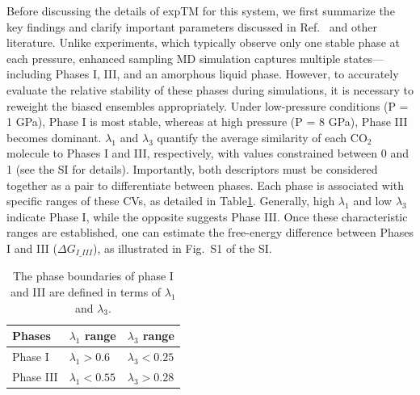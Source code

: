 \documentclass[aip,jcp,reprint,longbibliography]{revtex4-1}
\newcommand{\ryw}[1]{{\color{blue}{#1}}}
\begin{document}
Before discussing the details of expTM for this system, we first summarize the key findings and clarify important parameters discussed in Ref.~ and other literature.
Unlike experiments, which typically observe only one stable phase at each pressure, enhanced sampling MD simulation captures multiple states—including Phases I, III, and an amorphous liquid phase. However, to accurately evaluate the relative stability of these phases during simulations, it is necessary to reweight the biased ensembles appropriately.\cite{Ilaria2017CO2} Under low-pressure conditions (P = 1 GPa), Phase I is most stable, whereas at high pressure (P = 8 GPa), Phase III becomes dominant. 
\ryw{Instead of using the full atomic coordinates, we employ the CVs $\lambda_1$ and $\lambda_3$ to characterize the phase states, effectively reducing the description to a two-dimensional space.  }
$\lambda_1$ and $\lambda_3$ quantify the average similarity of each CO$_2$ molecule to Phases I and III, respectively, with values constrained between 0 and 1 (see the SI for details). 
Importantly, both descriptors must be considered together as a pair to differentiate between phases. Each phase is associated with specific ranges of these CVs, as detailed in Table\ref{tab:phaseboundary}. Generally, high $\lambda_1$ and low $\lambda_3$ indicate Phase I, while the opposite suggests Phase III. Once these characteristic ranges are established, one can estimate the free-energy difference between Phases I and III ($\Delta G_{I\_III}$), as illustrated in Fig.~S1 of the SI.


\begin{table}[ht!]
\begin{tabularx}{0.5\textwidth}{XXX}
\hline
    Phases & $\lambda_1$ range  & $\lambda_3$  range \\
\hline
Phase I &  $\lambda_1>0.6$  &  $\lambda_3<0.25$ \\
Phase III & $\lambda_1<0.55$  &  $\lambda_3>0.28$ \\

\hline
\end{tabularx}%
\caption{\label{tab:phaseboundary}%
The phase boundaries of phase I and III are defined in terms of $\lambda_1$ and $\lambda_3$.}
\end{table}
\end{document}
